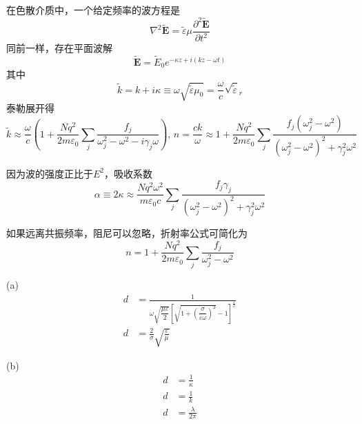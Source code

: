 在色散介质中，一个给定频率的波方程是
\begin{equation}
    \nabla^2\widetilde{\boldsymbol{E}}=\widetilde{\varepsilon}\mu\frac{\partial^2\widetilde{\boldsymbol{E}}}{\partial t^2}
\end{equation}
同前一样，存在平面波解
\begin{equation}
    \widetilde{\boldsymbol{E}}=\widetilde{E}_0e^{-\kappa z+i(kz-\omega t)}
\end{equation}
其中
\begin{equation}
    \widetilde{k}=k+i\kappa\equiv\omega\sqrt{\widetilde{\varepsilon}\mu_0}=\frac{\omega}{c}\sqrt{\widetilde{\varepsilon}}_r
\end{equation}
泰勒展开得
\begin{equation}
    \widetilde{k}\approx\frac{\omega}{c}\left(1+\frac{Nq^2}{2m\varepsilon_0}\sum_j\frac{f_j}{\omega_j^2-\omega^2-i\gamma_j\omega}\right),\, n=\frac{ck}{\omega}\approx1+\frac{Nq^2}{2m\varepsilon_0}\sum_j\frac{f_j\left(\omega_j^2-\omega^2\right)}{\left(\omega_j^2-\omega^2\right)^2+\gamma_j^2\omega^2}
    \label{复波数}
\end{equation}

因为波的强度正比于$E^2$，吸收系数
\begin{equation}
    \alpha\equiv2\kappa\approx\frac{Nq^2\omega^2}{m\varepsilon_0c}\sum_j\frac{f_j\gamma_j}{\left(\omega_j^2-\omega^2\right)^2+\gamma_j^2\omega^2}
\end{equation}

如果远离共振频率，阻尼可以忽略，折射率公式可简化为
\begin{equation}
    n=1+\frac{Nq^2}{2m\varepsilon_0}\sum_j\frac{f_j}{\omega_j^2-\omega^2}
\end{equation}


(a)
\begin{align*}
    d&=\frac{1}{\omega\sqrt{\dfrac{\mu\varepsilon}{2}}\left[\sqrt{1+\left(\dfrac{\sigma}{\varepsilon\omega}\right)^2}-1\right]^\frac{1}{2}}\\
    d&=\frac{2}{\sigma}\sqrt{\frac{\varepsilon}{\mu}}
\end{align*}

(b)\begin{align*}
d&=\frac{1}{\kappa}\\
d&=\frac{1}{k}\\
d&=\frac{\lambda}{2\pi}
\end{align*}

